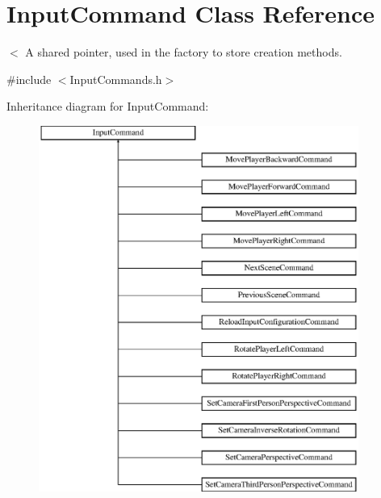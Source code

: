 \hypertarget{class_input_command}{}\section{Input\+Command Class Reference}
\label{class_input_command}


$<$ A shared pointer, used in the factory to store creation methods.  




{\ttfamily \#include $<$Input\+Commands.\+h$>$}

Inheritance diagram for Input\+Command\+:\begin{figure}[H]
\begin{center}
\leavevmode
\includegraphics[height=12.000000cm]{class_input_command}
\end{center}
\end{figure}
